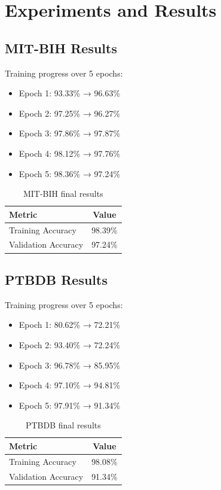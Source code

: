 \documentclass{article}
\begin{document}
\section{Experiments and Results}

\subsection{MIT-BIH Results}
Training progress over 5 epochs:
\begin{itemize}
    \item Epoch 1: 93.33\% → 96.63\%
    \item Epoch 2: 97.25\% → 96.27\%
    \item Epoch 3: 97.86\% → 97.87\%
    \item Epoch 4: 98.12\% → 97.76\%
    \item Epoch 5: 98.36\% → 97.24\%
\end{itemize}

\begin{table}[H]
\centering
\begin{tabular}{@{}lc@{}}
\toprule
\textbf{Metric} & \textbf{Value} \\
\midrule
Training Accuracy & 98.39\% \\
Validation Accuracy & 97.24\% \\
\bottomrule
\end{tabular}
\caption{MIT-BIH final results}
\label{tab:mitbih}
\end{table}

\subsection{PTBDB Results}
Training progress over 5 epochs:
\begin{itemize}
    \item Epoch 1: 80.62\% → 72.21\%
    \item Epoch 2: 93.40\% → 72.24\%
    \item Epoch 3: 96.78\% → 85.95\%
    \item Epoch 4: 97.10\% → 94.81\%
    \item Epoch 5: 97.91\% → 91.34\%
\end{itemize}

\begin{table}[H]
\centering
\begin{tabular}{@{}lc@{}}
\toprule
\textbf{Metric} & \textbf{Value} \\
\midrule
Training Accuracy & 98.08\% \\
Validation Accuracy & 91.34\% \\
\bottomrule
\end{tabular}
\caption{PTBDB final results}
\label{tab:ptbdb}
\end{table}
\end{document}
